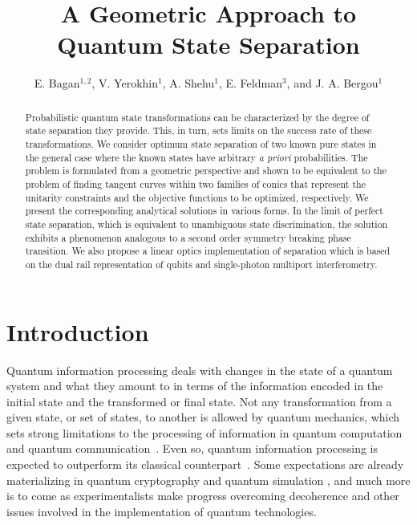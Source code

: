 \documentclass[aps,pra,twocolumn,showpacs]{revtex4-1}
\begin{document}
 \title{A Geometric Approach to Quantum State Separation}
\author{ E. Bagan$^{1,2}$, V. Yerokhin$^{1}$, A. Shehu$^{1}$, E. Feldman$^{3}$, and J. A. Bergou$^{1}$}

\begin{abstract} 
Probabilistic quantum state transformations can be characterized by the degree of state separation they provide. This, in turn, sets limits on the success rate of these transformations. We consider optimum state separation of two known pure states in the general case where the known states have arbitrary {\emph{a priori}} probabilities. The problem is formulated from a geometric perspective and shown to be equivalent to the problem of finding tangent curves within two families of conics that represent the unitarity constraints and the objective functions to be optimized, respectively. We present the corresponding analytical solutions in various forms.  In the limit of perfect state separation, which is equivalent to unambiguous state discrimination, the solution exhibits a phenomenon analogous to a second order symmetry breaking phase transition. We also propose a linear optics implementation of separation which is based on the dual rail representation of qubits and single-photon multiport interferometry.
\end{abstract}
\maketitle 


\section{Introduction}\label{sec intro}

Quantum information processing deals with changes in the state of a quantum system and what they amount to in terms of the information encoded in the initial state and the transformed or final state. Not any transformation from a given state, or set of states, to another is allowed by quantum mechanics, which sets strong limitations to the processing of information in quantum computation and quantum communication~\cite{Nielsen&Chuang}. Even so, quantum information processing is expected to outperform its classical counterpart~\cite{Bennett}. Some expectations are already materializing in quantum cryptography \cite{Crypto,Korzh} and quantum simulation \cite{simu,Thompson}, and much more is to come as experimentalists make progress overcoming decoherence and other issues involved in the implementation of quantum technologies.
\end{document}

